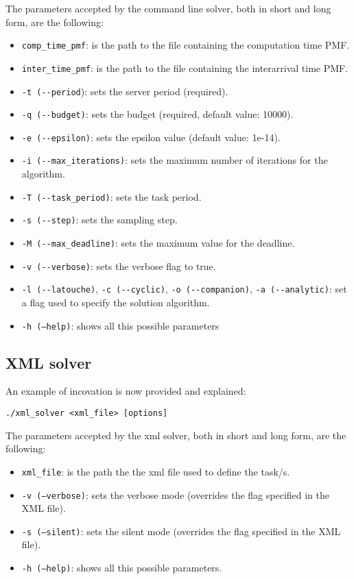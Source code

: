 The parameters accepted by the command line solver, both in short and long form, are the following:
\begin{itemize}
  \item \texttt{comp\_time\_pmf}: is the path to the file containing the computation time PMF.
  \item \texttt{inter\_time\_pmf}: is the path to the file containing the interarrival time PMF.
  \item \texttt{-t (-{}-period}): sets the server period (required).
  \item \texttt{-q (-{}-budget)}: sets the budget (required, default value: 10000).
  \item \texttt{-e (-{}-epsilon)}: sets the epsilon value (default value: 1e-14).
  \item \texttt{-i (-{}-max\_iterations)}: sets the maximum number of iterations for the algorithm.
  \item \texttt{-T (-{}-task\_period)}: sets the task period.
  \item \texttt{-s (-{}-step)}: sets the sampling step.
  \item \texttt{-M (-{}-max\_deadline)}: sets the maximum value for the deadline.
  \item \texttt{-v (-{}-verbose)}: sets the verbose flag to true.
  \item \texttt{-l (-{}-latouche)}, \texttt{-c (-{}-cyclic)}, \texttt{-o (-{}-companion)}, \texttt{-a (-{}-analytic)}: set a flag used to specify the solution algorithm. 
  \item \texttt{-h (--help)}: shows all this possible parameters
\end{itemize}
 
\subsection{XML solver}
An example of incovation is now provided and explained:
\begin{lstlisting}[frame=bt, numbers=none]
  ./xml_solver <xml_file> [options]
\end{lstlisting}

The parameters accepted by the xml solver, both in short and long form, are the following:
\begin{itemize}
  \item \texttt{xml\_file}: is the path the the xml file used to define the task/s.
  \item \texttt{-v (--verbose)}: sets the verbose mode (overrides the flag specified in the XML file).
  \item \texttt{-s (--silent)}: sets the silent mode (overrides the flag specified in the XML file).
  \item \texttt{-h (--help)}: shows all this possible parameters.
\end{itemize}

